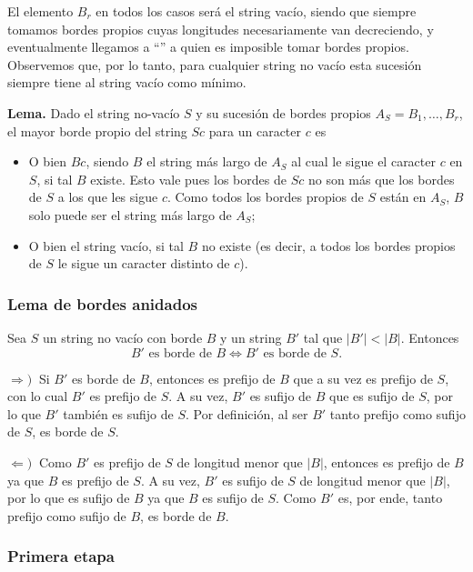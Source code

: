 El elemento $B_r$ en todos los casos será el string vacío, siendo que siempre tomamos bordes propios cuyas longitudes necesariamente van decreciendo, y eventualmente llegamos a ``'' a quien es imposible tomar bordes propios. Observemos que, por lo tanto, para cualquier string no vacío esta sucesión siempre tiene al string vacío como mínimo.

\medskip

\textbf{Lema.} Dado el string no-vacío $S$ y su sucesión de bordes propios $A_S = B_1, \dots, B_r$, el mayor borde propio del string $Sc$ para un caracter $c$ es

\begin{itemize}
\setlength\itemsep{0em}
\item O bien $Bc$, siendo $B$ el string más largo de $A_S$ al cual le sigue el caracter $c$ en $S$, si tal $B$ existe.
	Esto vale pues los bordes de $Sc$ no son más que los bordes de $S$ a los que les sigue $c$.
	Como todos los bordes propios de $S$ están en $A_S$, $B$ solo puede ser el string más largo de $A_S$;
\item O bien el string vacío, si tal $B$ no existe (es decir, a todos los bordes propios de $S$ le sigue un caracter distinto de $c$).
\end{itemize}

\subsubsection{Lema de bordes anidados}

Sea $S$ un string no vacío con borde $B$ y un string $B'$ tal que $|B'| < |B|$. Entonces
\[
	B' \text{ es borde de } B \iff B' \text{ es borde de } S.
\]

\medskip

$\Longrightarrow) \ $ Si $B'$ es borde de $B$, entonces es prefijo de $B$ que a su vez es prefijo de $S$, con lo cual $B'$ es prefijo de $S$. A su vez, $B'$ es sufijo de $B$ que es sufijo de $S$, por lo que $B'$ también es sufijo de $S$. Por definición, al ser $B'$ tanto prefijo como sufijo de $S$, es borde de $S$.

$\Longleftarrow) \ $ Como $B'$ es prefijo de $S$ de longitud menor que $|B|$, entonces es prefijo de $B$ ya que $B$ es prefijo de $S$. A su vez, $B'$ es sufijo de $S$ de longitud menor que $|B|$, por lo que es sufijo de $B$ ya que $B$ es sufijo de $S$. Como $B'$ es, por ende, tanto prefijo como sufijo de $B$, es borde de $B$.

\subsubsection{Primera etapa}

